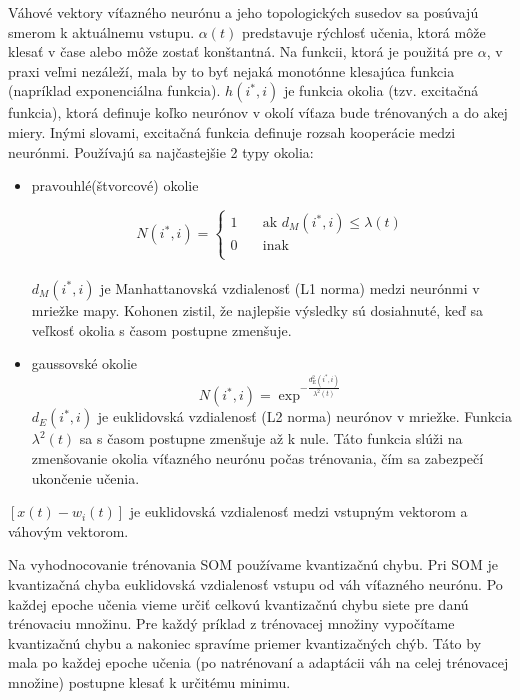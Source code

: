 Váhové vektory víťazného neurónu a jeho topologických susedov sa posúvajú smerom k aktuálnemu vstupu.
$\alpha(t)$ predstavuje rýchlosť učenia, ktorá môže klesať v čase alebo môže zostať konštantná. Na funkcii, ktorá je použitá pre $\alpha$, v praxi veľmi nezáleží, mala by to byť nejaká monotónne klesajúca funkcia (napríklad exponenciálna funkcia). 
$h(i^*, i)$ je funkcia okolia (tzv. excitačná funkcia), ktorá definuje koľko neurónov v okolí víťaza bude trénovaných a do akej miery. Inými slovami, excitačná funkcia definuje rozsah kooperácie medzi neurónmi. Používajú sa najčastejšie 2 typy okolia:
\begin{itemize}
\item pravouhlé(štvorcové) okolie

\[
N(i^{*},i) =
     \begin{cases}
       \text{1} &\quad\text{ak } d_{M}(i^*, i) \leq \lambda(t) \\
       \text{0} &\quad\text{inak}\\
     \end{cases}
\]
\\
$d_{M}(i^{*}, i)$ je Manhattanovská vzdialenosť (L1 norma) medzi neurónmi v mriežke mapy. Kohonen zistil, že najlepšie výsledky sú dosiahnuté, keď
sa veľkosť okolia s časom postupne zmenšuje.
\item gaussovské okolie
	\begin{equation}
		N(i^{*}, i) = \exp^{- \frac{d^{2}_{E}(i^{*}, i)}{\lambda^{2}(t)}}
	\end{equation}
$d_{E}(i^{*}, i)$ je euklidovská vzdialenosť (L2 norma) neurónov v mriežke. Funkcia $\lambda^2(t)$ sa s časom postupne zmenšuje až k nule. Táto
	funkcia slúži na zmenšovanie okolia víťazného neurónu počas trénovania, čím sa zabezpečí ukončenie učenia.
\end{itemize}

$[x(t) - w_i(t)]$ je euklidovská vzdialenosť medzi vstupným vektorom a váhovým vektorom.

Na vyhodnocovanie trénovania SOM používame kvantizačnú chybu. 
Pri SOM je kvantizačná chyba euklidovská vzdialenosť vstupu
od váh víťazného neurónu. 
Po každej epoche učenia vieme určiť celkovú kvantizačnú chybu siete pre danú trénovaciu množinu.
Pre každý príklad z trénovacej množiny vypočítame kvantizačnú chybu a nakoniec spravíme priemer kvantizačných chýb. %
 Táto by mala po každej epoche učenia (po natrénovaní a adaptácii váh na celej trénovacej množine) postupne klesať k určitému minimu.

